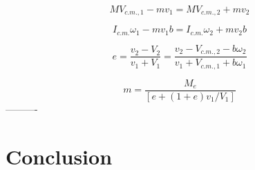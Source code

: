 \documentclass[%
 aip,
 amsmath,amssymb,
 reprint,%
 floatfix,%
]{revtex4-1}
\begin{document}
\begin{equation}
	M V_{c.m.,1} - mv_1 = M V_{c.m.,2} + mv_2
\end{equation}

\begin{equation}
	I_{c.m.} \omega_1 - mv_1b=I_{c.m.} \omega_2 + mv_2b
\end{equation}

\begin{equation}
	e=\frac{v_2 - V_2}{v_1 + V_1} = \frac{v_2 - V_{c.m.,2} - b \omega_2}{v_1 + V_{c.m.,1} + b \omega_1}
\end{equation}

\begin{equation}
	m= \frac{M_e}{[e+(1+e)v_1/V_1]}
\end{equation}
----------

\section{\label{sec:level6}Conclusion}

\nocite{*}
\end{document}

